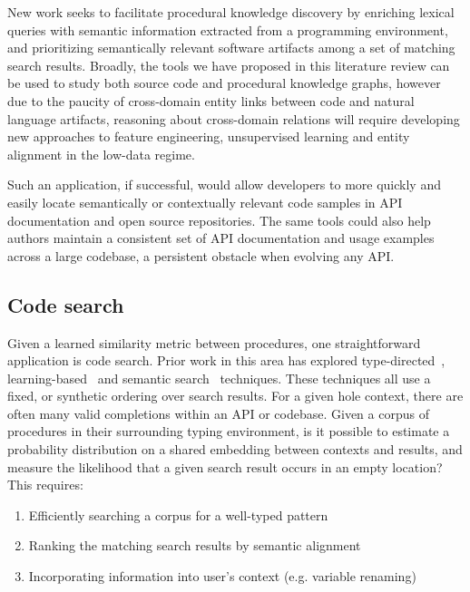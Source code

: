 \documentclass[10pt]{article}
\begin{document}
New work seeks to facilitate procedural knowledge discovery by enriching lexical queries with semantic information extracted from a programming environment, and prioritizing semantically relevant software artifacts among a set of matching search results. Broadly, the tools we have proposed in this literature review can be used to study both source code and procedural knowledge graphs, however due to the paucity of cross-domain entity links between code and natural language artifacts, reasoning about cross-domain relations will require developing new approaches to feature engineering, unsupervised learning and entity alignment in the low-data regime.

Such an application, if successful, would allow developers to more quickly and easily locate semantically or contextually relevant code samples in API documentation and open source repositories. The same tools could also help authors maintain a consistent set of API documentation and usage examples across a large codebase, a persistent obstacle when evolving any API.

  \pagebreak\subsection{Code search}\label{subsec:code-search}

Given a learned similarity metric between procedures, one straightforward application is code search. Prior work in this area has explored type-directed~\cite{james2020digging}, learning-based~\cite{gu2018deep} and semantic search~\cite{premtoon2020semantic} techniques. These techniques all use a fixed, or synthetic ordering over search results. For a given hole context, there are often many valid completions within an API or codebase. Given a corpus of procedures in their surrounding typing environment, is it possible to estimate a probability distribution on a shared embedding between contexts and results, and measure the likelihood that a given search result occurs in an empty location? This requires:

  \begin{enumerate}
    \item Efficiently searching a corpus for a well-typed pattern
    \item Ranking the matching search results by semantic alignment
    \item Incorporating information into user's context (e.g. variable renaming)
  \end{enumerate}
\end{document}
